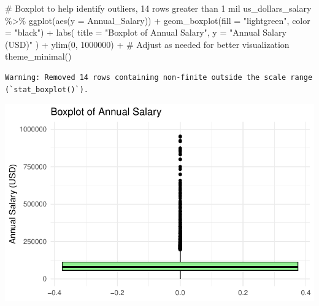 \documentclass[
  letterpaper,
  DIV=11,
  numbers=noendperiod]{scrartcl}
\newenvironment{Shaded}{\begin{snugshade}}{\end{snugshade}}
\newcommand{\AttributeTok}[1]{\textcolor[rgb]{0.40,0.45,0.13}{#1}}
\newcommand{\CommentTok}[1]{\textcolor[rgb]{0.37,0.37,0.37}{#1}}
\newcommand{\DecValTok}[1]{\textcolor[rgb]{0.68,0.00,0.00}{#1}}
\newcommand{\FunctionTok}[1]{\textcolor[rgb]{0.28,0.35,0.67}{#1}}
\newcommand{\NormalTok}[1]{\textcolor[rgb]{0.00,0.23,0.31}{#1}}
\newcommand{\SpecialCharTok}[1]{\textcolor[rgb]{0.37,0.37,0.37}{#1}}
\newcommand{\StringTok}[1]{\textcolor[rgb]{0.13,0.47,0.30}{#1}}
\begin{document}
\begin{Shaded}
\begin{Highlighting}[]
\CommentTok{\# Boxplot to help identify outliers, 14 rows greater than 1 mil}
\NormalTok{us\_dollars\_salary }\SpecialCharTok{\%\textgreater{}\%}
  \FunctionTok{ggplot}\NormalTok{(}\FunctionTok{aes}\NormalTok{(}\AttributeTok{y =}\NormalTok{ Annual\_Salary)) }\SpecialCharTok{+}
  \FunctionTok{geom\_boxplot}\NormalTok{(}\AttributeTok{fill =} \StringTok{"lightgreen"}\NormalTok{, }\AttributeTok{color =} \StringTok{"black"}\NormalTok{) }\SpecialCharTok{+}
  \FunctionTok{labs}\NormalTok{(}
    \AttributeTok{title =} \StringTok{"Boxplot of Annual Salary"}\NormalTok{,}
    \AttributeTok{y =} \StringTok{"Annual Salary (USD)"}
\NormalTok{  ) }\SpecialCharTok{+}
  \FunctionTok{ylim}\NormalTok{(}\DecValTok{0}\NormalTok{, }\DecValTok{1000000}\NormalTok{) }\SpecialCharTok{+} \CommentTok{\# Adjust as needed for better visualization}
  \FunctionTok{theme\_minimal}\NormalTok{()}
\end{Highlighting}
\end{Shaded}

\begin{verbatim}
Warning: Removed 14 rows containing non-finite outside the scale range
(`stat_boxplot()`).
\end{verbatim}

\includegraphics{PS1_files/figure-pdf/unnamed-chunk-15-2.pdf}
\end{document}

